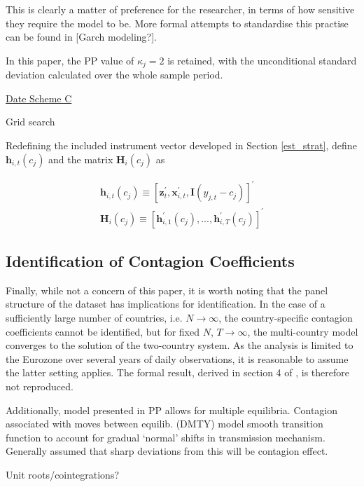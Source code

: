 \documentclass[../base.tex]{subfiles}
\begin{document}
This is clearly a matter of preference for the researcher, in terms of how sensitive they require the model to be. More formal attempts to standardise this practise can be found in [Garch modeling?]. 

In this paper, the PP value of $\kappa_j = 2$ is retained, with the unconditional standard deviation calculated over the whole sample period.

\underline{Date Scheme C}

Grid search

Redefining the included instrument vector developed in Section \ref{est_strat}, define $\mathbf{h}_{i,t}(c_j)$ and the matrix $\mathbf{H}_{i}(c_j)$ as

\begin{align}
	\mathbf{h}_{i,t}(c_j) \equiv [\mathbf{z}_{t}^{\prime}, \mathbf{x}_{i,t}^{\prime}, \mathbf{I}(y_{j,t} - c_j)]^\prime \\
	\mathbf{H}_i(c_j) \equiv [\mathbf{h}_{i,1}^{\prime}(c_j), ... , \mathbf{h}_{i,T}^{\prime}(c_j)]^{\prime}
\end{align}





\subsection{Identification of Contagion Coefficients}
\label{ident}

Finally, while not a concern of this paper, it is worth noting that the panel structure of the dataset has implications for identification. In the case of a sufficiently large number of countries, i.e. $N \rightarrow \infty$, the country-specific contagion coefficients cannot be identified, but for fixed $N$, $T \rightarrow \infty$, the multi-country model converges to the solution of the two-country system. As the analysis is limited to the Eurozone over several years of daily observations, it is reasonable to assume the latter setting applies. The formal result, derived in section 4 of \cite{pesaran2007econometric}, is therefore not reproduced.

Additionally, model presented in PP allows for multiple equilibria. Contagion associated with moves between equilib. \cite{dungey2015endogenous} (DMTY) model smooth transition function to account for gradual `normal' shifts in transmission mechanism. Generally assumed that sharp deviations from this will be contagion effect. 

Unit roots/cointegrations?
\end{document}
